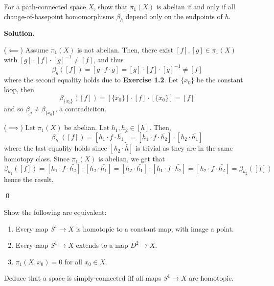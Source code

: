 \documentclass[12pt]{book}
\theoremstyle{definition}
\newenvironment{solution}
{%
  \par\noindent\textbf{Solution.}\quad
}
{%
  \qed\par
}
{
  \vspace{2pt}
}
\begin{document}
\begin{taggedexercise}[\textcolor{green}{Complete}]
  For a path-connected space $X$, show that $\pi_1(X)$ is abelian if and only if all change-of-basepoint homomorphisms $\beta_h$
  depend only on the endpoints of $h$.
\end{taggedexercise}

\begin{solution}

  ($\impliedby$) Assume $\pi_1(X)$ is not abelian.
  Then, there exist $[f], [g] \in \pi_1(X)$ with $[g] \cdot [f] \cdot [g]^{-1} \neq [f]$, and thus
  \[
  \beta_g([f]) = [g\cdot f \cdot \bar{g}] = [g] \cdot [f] \cdot [g]^{-1} \neq [f]
  \]
  where the second equality holds due to \textbf{Exercise 1.2}.
  Let $\{x_0\}$ be the constant loop, then
  \[
    \beta_{\{x_0\}}([f]) = [\{x_0\}] \cdot [f] \cdot [\{x_0\}] = [f]
  \]
  and so $\beta_g \neq \beta_{\{x_0\}}$, a contradiciton.


  ($\implies$) Let $\pi_1(X)$ be abelian.
  Let $h_1, h_2 \in [h]$. 
  Then,
  \[\beta_{h_1}([f]) = [h_1 \cdot f \cdot \bar{h_1}] = [h_1 \cdot f \cdot \bar{h_2}] \cdot [h_2 \cdot \bar{h_1}]\]
  where the last equality holds since $[h_2 \cdot \bar{h}]$ is trivial as they are in the same homotopy class.
  Since $\pi_1(X)$ is abelian, we get that 
  \[\beta_{h_1}([f]) = [h_1 \cdot f \cdot \bar{h_2}] \cdot [h_2 \cdot \bar{h_1}] = [h_2 \cdot \bar{h_1}] \cdot[h_1 \cdot f \cdot \bar{h_2}] = [h_2 \cdot f \cdot \bar{h_2}] = \beta_{h_2}([f])\]
  hence the result.

\end{solution}

\begin{taggedexercise}[\textcolor{red}{TODO}]
  
\end{taggedexercise}

\begin{taggedexercise}[\textcolor{green}{Complete}]
  Show the following are equivalent:
  \begin{enumerate}
    \item Every map $S^1 \to X$ is homotopic to a constant map, with image a point.
    \item Every map $S^1 \to X$ extends to a map $D^2 \to X$.
    \item $\pi_1(X, x_0) = 0$ for all $x_0\in X$.
  \end{enumerate}
  Deduce that a space is simply-connected iff all maps $S^1 \to X$ are homotopic.
\end{taggedexercise}
\end{document}
